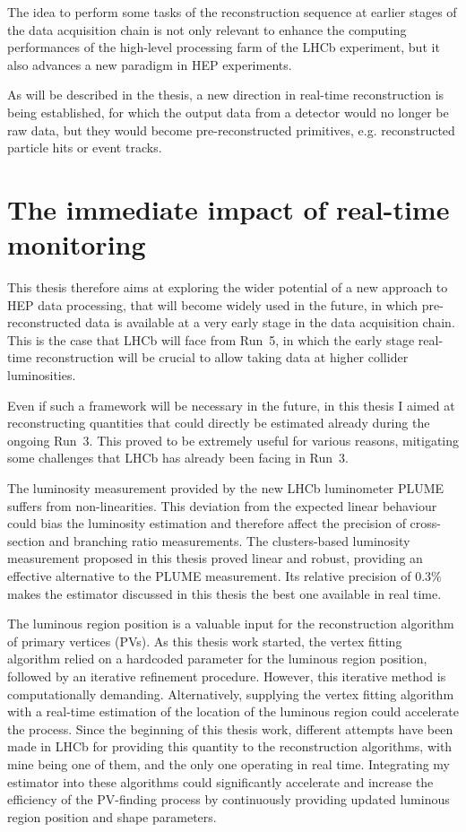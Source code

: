 The idea to perform some tasks of the reconstruction sequence at earlier stages of the data acquisition chain is not only relevant to enhance the computing performances of the high-level processing farm of the LHCb experiment, but it also advances a new paradigm in HEP experiments. 

As  will be described in the thesis, a new direction in real-time reconstruction is being established, for which the output data from a detector would no longer be raw data, but they would become pre-reconstructed primitives, e.g. reconstructed particle hits or event tracks.
 

\section{The immediate impact of real-time monitoring}
This thesis therefore aims at exploring the wider potential of a new approach to HEP data processing, that will become widely used in the future, in which pre-reconstructed data is available at a very early stage in the data acquisition chain. This is the case that LHCb will face from Run~5, in which the early stage real-time reconstruction will be crucial to allow taking data at higher collider luminosities. 

Even if such a framework will be necessary in the future, in this thesis I aimed at reconstructing quantities that could directly be estimated already during the ongoing Run~3. This proved to be extremely useful for various reasons, mitigating some challenges that LHCb has already been facing in Run~3.

The luminosity measurement provided by the new LHCb luminometer PLUME suffers from non-linearities. This deviation from the expected linear behaviour could bias the luminosity estimation and therefore affect the precision of cross-section and branching ratio measurements. The clusters-based luminosity measurement proposed in this thesis proved linear and robust, providing an effective alternative to the PLUME measurement. Its relative precision of $0.3\%$ makes the estimator discussed in this thesis the best one available in real time.

The luminous region position is a valuable input for the reconstruction algorithm of primary vertices (PVs). As this thesis work started, the vertex fitting algorithm relied on a hardcoded parameter for the luminous region position, followed by an iterative refinement procedure. However, this iterative method is computationally demanding. Alternatively, supplying the vertex fitting algorithm with a real-time estimation of the location of the luminous region could accelerate the process. Since the beginning of this thesis work, different attempts have been made in LHCb for providing this quantity to the reconstruction algorithms, with mine being one of them, and the only one operating in real time. Integrating my estimator into these algorithms could significantly accelerate and increase the efficiency of the PV-finding process by continuously providing updated luminous region position and shape parameters. 


